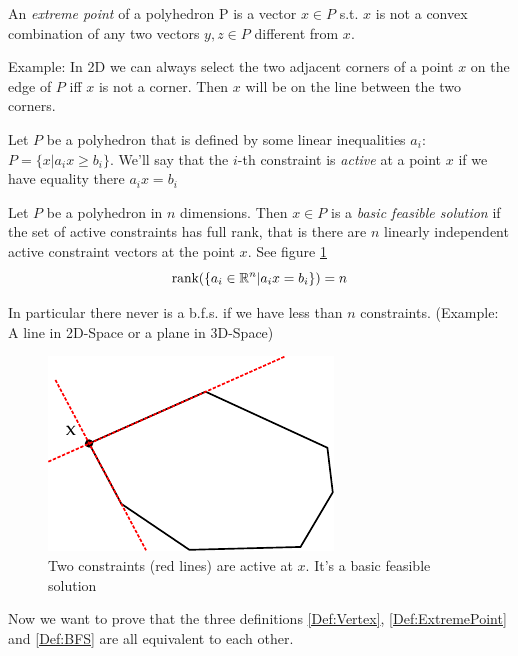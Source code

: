 \begin{Def}\label{Def:ExtremePoint} An \emph{extreme point} of a polyhedron P is a vector $x\in P$ s.t. $x$ is not a convex combination of any two vectors $y,z\in P$ different from $x$. 
\end{Def}
Example: In 2D we can always select the two adjacent corners of a point $x$ on the edge of $P$ iff $x$ is not a corner. Then $x$ will be on the line between the two corners. 

\begin{Def}\label{Def:ActiveConstraint} Let $P$ be a polyhedron that is defined by some linear inequalities $a_i$: $P=\{x|a_ix\geq b_i\}$. We'll say that the $i$-th constraint is \emph{active} at a point $x$ if we have equality there $a_ix = b_i$
\end{Def}

\begin{Def}\label{Def:BFS} Let $P$ be a polyhedron in $n$ dimensions. Then $x\in P$ is a \emph{basic feasible solution} if the set of active constraints has full rank, that is there are $n$ linearly independent active constraint vectors at the point $x$. See figure \ref{Fig:bfsActiveConstraints}
\[\mbox{rank}(\{a_i\in \mathbb{R}^n|a_ix=b_i\}) = n\]

In particular there never is a b.f.s. if we have less than $n$ constraints. (Example: A line in 2D-Space or a plane in 3D-Space)
\end{Def}

\begin{figure}[hbt]
\begin{center}
\includegraphics{./images/bfs.pdf}
\end{center}
\caption{Two constraints (red lines) are active at $x$. It's a basic feasible solution}
\label{Fig:bfsActiveConstraints}
\end{figure}

Now we want to prove that the three definitions \ref{Def:Vertex}, \ref{Def:ExtremePoint} and \ref{Def:BFS} are all equivalent to each other.

